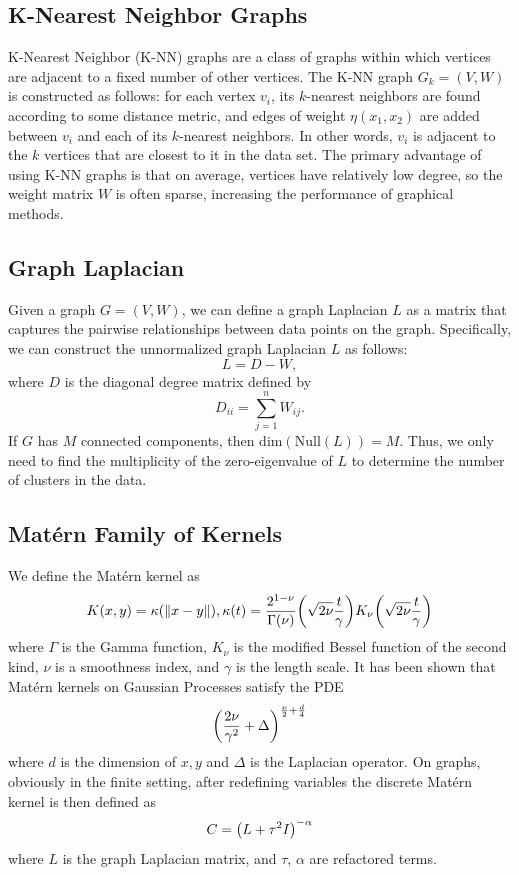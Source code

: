 \documentclass[12pt]{amsart}
\begin{document}
\subsection{K-Nearest Neighbor Graphs}
K-Nearest Neighbor (K-NN) graphs are a class of graphs within which vertices are adjacent to a fixed number of other vertices. The K-NN graph $G_k = (V, W)$ is constructed as follows: for each vertex $v_i$, its $k$-nearest neighbors are found according to some distance metric, and edges of weight $\eta(x_1,x_2)$ are added between $v_i$ and each of its $k$-nearest neighbors. In other words, $v_i$ is adjacent to the $k$ vertices that are closest to it in the data set. The primary advantage of using K-NN graphs is that on average, vertices have relatively low degree, so the weight matrix $W$ is often sparse, increasing the performance of graphical methods.

\subsection{Graph Laplacian}
Given a graph $G = (V, W)$, we can define a graph Laplacian $L$ as a matrix that captures the pairwise relationships between data points on the graph. Specifically, we can construct the unnormalized graph Laplacian $L$ as follows:
$$ L = D - W, $$
where $D$ is the diagonal degree matrix defined by
\[D_{ii} = \sum_{j = 1}^n W_{ij}.\]
If $G$ has $M$ connected components, then $\mathrm{dim}(\mathrm{Null}(L))=M$. Thus, we only need to find the multiplicity of the zero-eigenvalue of $L$ to determine the number of clusters in the data.

\subsection{Matérn Family of Kernels}
We define the Matérn kernel as
\[
  K(x,y) = \kappa({\left\|x-y\right\|}), \kappa(t) = \frac{2^{1-\nu}}{\Gamma(\nu)}{\left(\sqrt{2\nu}\frac{t}{\gamma}\right)}K_{\nu}{\left(\sqrt{2\nu}\frac{t}{\gamma}\right)}
\]
where $\Gamma$ is the Gamma function, $K_{\nu}$ is the modified Bessel function of the second kind, $\nu$ is a smoothness index, and $\gamma$ is the length scale. It has been shown that Matérn kernels on Gaussian Processes satisfy the PDE 
\[
  {\left(\frac{2\nu}{\gamma ^2} + \Delta\right)}^{\frac{\nu}{2} + \frac{d}{4}}
\]
where $d$ is the dimension of $x,y$ and $\Delta$ is the Laplacian operator. On graphs, obviously in the finite setting, after redefining variables the discrete Matérn kernel is then defined as
\[
  C = {\left(L + \tau^2 I\right)}^{-\alpha}
\]
where $L$ is the graph Laplacian matrix, and $\tau$, $\alpha$ are refactored terms.
\end{document}
